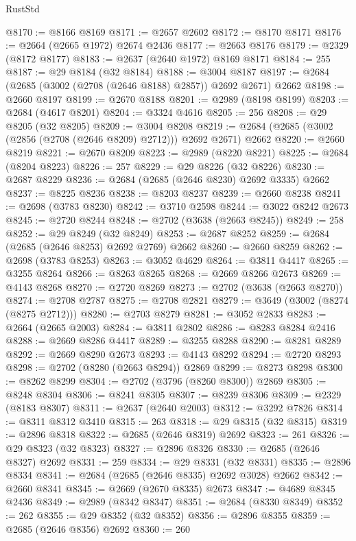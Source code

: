 \begin{lexlean}{RustStd}
\begin{coremodule}
@8170 := @8166 @8169
@8171 := @2657 @2602
@8172 := @8170 @8171
@8176 := @2664 (@2665 @1972) @2674 @2436
@8177 := @2663 @8176
@8179 := @2329 (@8172 @8177)
@8183 := @2637 (@2640 @1972) @8169 @8171
@8184 := 255
@8187 := @29 @8184 (@32 @8184)
@8188 := @3004 @8187
@8197 := @2684 (@2685 (@3002 (@2708 (@2646 @8188) @2857)) @2692 @2671) @2662
@8198 := @2660 @8197
@8199 := @2670 @8188
@8201 := @2989 (@8198 @8199)
@8203 := @2684 (@4617 @8201)
@8204 := @3324 @4616
@8205 := 256
@8208 := @29 @8205 (@32 @8205)
@8209 := @3004 @8208
@8219 := @2684 (@2685 (@3002 (@2856 (@2708 (@2646 @8209) @2712))) @2692 @2671) @2662
@8220 := @2660 @8219
@8221 := @2670 @8209
@8223 := @2989 (@8220 @8221)
@8225 := @2684 (@8204 @8223)
@8226 := 257
@8229 := @29 @8226 (@32 @8226)
@8230 := @2687 @8229
@8236 := @2684 (@2685 (@2646 @8230) @2692 @3335) @2662
@8237 := @8225 @8236
@8238 := @8203 @8237
@8239 := @2660 @8238
@8241 := @2698 (@3783 @8230)
@8242 := @3710 @2598
@8244 := @3022 @8242 @2673
@8245 := @2720 @8244
@8248 := @2702 (@3638 (@2663 @8245))
@8249 := 258
@8252 := @29 @8249 (@32 @8249)
@8253 := @2687 @8252
@8259 := @2684 (@2685 (@2646 @8253) @2692 @2769) @2662
@8260 := @2660 @8259
@8262 := @2698 (@3783 @8253)
@8263 := @3052 @4629
@8264 := @3811 @4417
@8265 := @3255 @8264
@8266 := @8263 @8265
@8268 := @2669 @8266 @2673
@8269 := @4143 @8268
@8270 := @2720 @8269
@8273 := @2702 (@3638 (@2663 @8270))
@8274 := @2708 @2787
@8275 := @2708 @2821
@8279 := @3649 (@3002 (@8274 (@8275 @2712)))
@8280 := @2703 @8279
@8281 := @3052 @2833
@8283 := @2664 (@2665 @2003)
@8284 := @3811 @2802
@8286 := @8283 @8284 @2416
@8288 := @2669 @8286 @4417
@8289 := @3255 @8288
@8290 := @8281 @8289
@8292 := @2669 @8290 @2673
@8293 := @4143 @8292
@8294 := @2720 @8293
@8298 := @2702 (@8280 (@2663 @8294)) @2869
@8299 := @8273 @8298
@8300 := @8262 @8299
@8304 := @2702 (@3796 (@8260 @8300)) @2869
@8305 := @8248 @8304
@8306 := @8241 @8305
@8307 := @8239 @8306
@8309 := @2329 (@8183 @8307)
@8311 := @2637 (@2640 @2003)
@8312 := @3292 @7826
@8314 := @8311 @8312 @3410
@8315 := 263
@8318 := @29 @8315 (@32 @8315)
@8319 := @2896 @8318
@8322 := @2685 (@2646 @8319) @2692
@8323 := 261
@8326 := @29 @8323 (@32 @8323)
@8327 := @2896 @8326
@8330 := @2685 (@2646 @8327) @2692
@8331 := 259
@8334 := @29 @8331 (@32 @8331)
@8335 := @2896 @8334
@8341 := @2684 (@2685 (@2646 @8335) @2692 @3028) @2662
@8342 := @2660 @8341
@8345 := @2669 (@2670 @8335) @2673
@8347 := @4689 @8345 @2436
@8349 := @2989 (@8342 @8347)
@8351 := @2684 (@8330 @8349)
@8352 := 262
@8355 := @29 @8352 (@32 @8352)
@8356 := @2896 @8355
@8359 := @2685 (@2646 @8356) @2692
@8360 := 260

\end{coremodule}
\end{lexlean}

